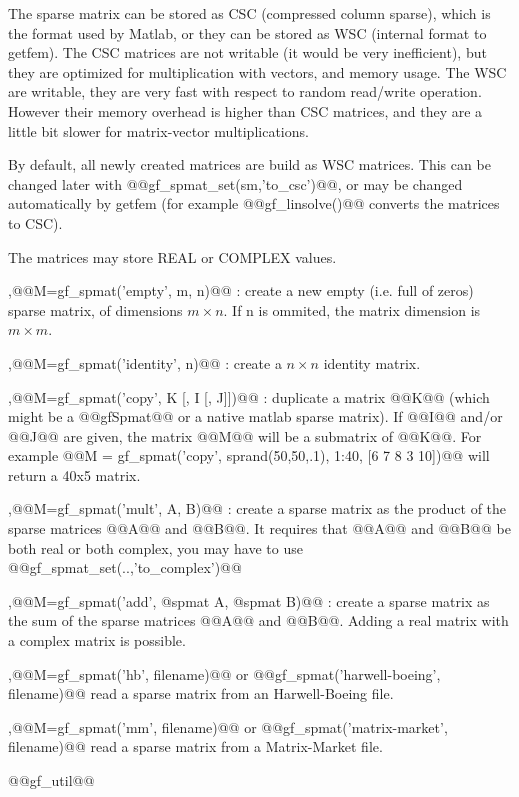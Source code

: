 \begin{cmddescription}
  The sparse matrix can be stored as CSC (compressed column sparse), which
  is the format used by Matlab, or they can be stored as WSC (internal format to
  getfem). The CSC matrices are not writable (it would be very inefficient), but
  they are optimized for multiplication with vectors, and memory usage. The WSC
  are writable, they are very fast with respect to random read/write operation.
  However their memory overhead is higher than CSC matrices, and they are a
  little bit slower for matrix-vector multiplications.

  By default, all newly created matrices are build as WSC matrices. This can
  be changed later with @@gf_spmat_set(sm,'to_csc')@@, or may be changed
  automatically by getfem (for example @@gf_linsolve()@@ converts the matrices to
  CSC).

  The matrices may store REAL or COMPLEX values.

  \sep{@@M=gf_spmat('empty', m, n)@@} : create a new empty (i.e. full of zeros) sparse matrix, of dimensions $m\times n$.
  If n is ommited, the matrix dimension is $m\times m$.

  \sep{@@M=gf_spmat('identity', n)@@} : create a $n\times n$ identity matrix.

  \sep{@@M=gf_spmat('copy', K [, I [, J]])@@} : duplicate a matrix @@K@@ (which might be a @@gfSpmat@@ or a native matlab sparse
  matrix). If @@I@@ and/or @@J@@ are given, the matrix @@M@@ will be a submatrix of @@K@@. For
  example @@M = gf_spmat('copy', sprand(50,50,.1), 1:40, [6 7 8 3 10])@@ will return a 40x5 matrix.
  
  \sep{@@M=gf_spmat('mult', A, B)@@} : create a sparse matrix as the product of the sparse matrices @@A@@ and @@B@@.  It
  requires that @@A@@ and @@B@@ be both real or both complex, you may have to use
  @@gf_spmat_set(..,'to_complex')@@

  \sep{@@M=gf_spmat('add', @spmat A, @spmat B)@@} : create a sparse matrix as the sum of the sparse matrices @@A@@ and @@B@@. Adding a
  real matrix with a complex matrix is possible.

  \sep{@@M=gf_spmat('hb', filename)@@} or @@gf_spmat('harwell-boeing', filename)@@ read a sparse matrix from an Harwell-Boeing file.

  \sep{@@M=gf_spmat('mm', filename)@@} or @@gf_spmat('matrix-market', filename)@@ read a sparse matrix from a Matrix-Market file.
\end{cmddescription}
\begin{gfseealso}
  @@gf\_util@@
\end{gfseealso}
\newpage

